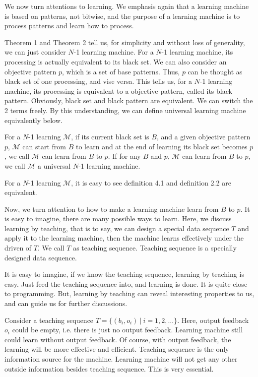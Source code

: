 We now turn attentions to learning. We emphasis again that a learning machine is based on patterns, not bitwise, and the purpose of a learning machine is to process patterns and learn how to process. 

Theorem 1 and Theorem 2 tell us, for simplicity and without loss of generality, we can just consider $N$-1 learning machine. For a $N$-1 learning machine, its processing is actually equivalent to its black set. We can also consider an objective pattern $p$, which is a set of base patterns. Thus, $p$ can be thought as black set of one processing, and vise versa. This tells us, for a $N$-1 learning machine, its processing is equivalent to a objective pattern, called its black pattern. Obviously, black set and black pattern are equivalent. We can switch the 2 terms freely. By this understanding, we can define universal learning machine equivalently below. 


\begin{definition} 
For a $N$-1 learning $\mathcal{M}$, if its current black set is $B$, and a given objective pattern $p$, $\mathcal{M}$ can start from $B$ to learn and at the end of learning its black set becomes $p$, we call $\mathcal{M}$ can learn from $B$ to $p$. If for any $B$ and $p$,  $\mathcal{M}$ can learn from $B$ to $p$, we call $\mathcal{M}$ a universal $N$-1 learning machine.   
\end{definition}
For a $N$-1 learning $\mathcal{M}$, it is easy to see definition 4.1 and definition 2.2 are equivalent. 

Now, we turn attention to how to make a learning machine learn from $B$ to $p$. It is easy to imagine, there are many possible ways to learn. Here, we discuss learning by teaching, that is to say, we can design a special data sequence $T$ and apply it to the learning machine, then the machine learns  effectively under the driven of $T$. We call $T$ as teaching sequence. Teaching sequence is a specially designed data sequence.


It is easy to imagine, if we know the teaching sequence, learning by teaching is easy. Just feed the teaching sequence into, and learning is done. It is quite close to programming. But, learning by teaching can reveal interesting properties to us, and can guide us for further discussions. 

Consider a teaching sequence $T = \{(b_i, o_i) \ |\  i = 1, 2, \ldots\}$. Here, output feedback $o_i$ could be empty, i.e. there is just no output feedback. Learning machine still could learn without output feedback. Of course, with output feedback, the learning will be more effective and efficient. Teaching sequence is the only information source for the machine. Learning machine will not get any other outside information besides teaching sequence. This is very essential. 





